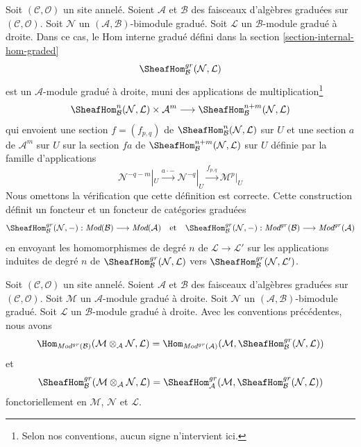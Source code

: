 \medskip\noindent
Soit $(\mathcal{C}, \mathcal{O})$ un site annelé. Soient $\mathcal{A}$ et
$\mathcal{B}$ des faisceaux d'algèbres graduées sur
$(\mathcal{C}, \mathcal{O})$. Soit $\mathcal{N}$ un
$(\mathcal{A}, \mathcal{B})$-bimodule gradué. Soit
$\mathcal{L}$ un $\mathcal{B}$-module gradué à droite. Dans ce
cas, le Hom interne gradué défini dans
la section \ref{section-internal-hom-graded}
$$
\SheafHom_\mathcal{B}^{gr}(\mathcal{N}, \mathcal{L})
$$ est un
$\mathcal{A}$-module gradué à droite, muni des
applications de multiplication\footnote{Selon nos conventions,
aucun signe n'intervient ici.}
$$
\SheafHom^n_\mathcal{B}(\mathcal{N}, \mathcal{L})
\times \mathcal{A}^m
\longrightarrow
\SheafHom^{n + m}_\mathcal{B}(\mathcal{N}, \mathcal{L})
$$ qui envoient
une section $f = (f_{p,q})$ de
$\SheafHom^n_\mathcal{B}(\mathcal{N}, \mathcal{L})$ sur $U$ et une
section $a$ de $\mathcal{A}^m$ sur $U$ sur la section
$f a$ de $\SheafHom^{n + m}_\mathcal{B}(\mathcal{N}, \mathcal{L})$ sur $U$ définie par la
famille d'applications
$$
\mathcal{N}^{-q - m}|_U \xrightarrow{a \cdot -}
\mathcal{N}^{-q}|_U \xrightarrow{f_{p, q}}
\mathcal{M}^p|_U
$$ Nous omettons
la vérification que cette définition est correcte. Cette construction
définit un foncteur et un foncteur de catégories graduées
$$
\SheafHom_\mathcal{B}^{gr}(\mathcal{N}, -)
: \textit{Mod}(\mathcal{B})
\longrightarrow
\textit{Mod}(\mathcal{A})
\quad\text{et}\quad
\SheafHom_\mathcal{B}^{gr}(\mathcal{N}, -) :
\textit{Mod}^{gr}(\mathcal{B})
\longrightarrow
\textit{Mod}^{gr}(\mathcal{A})
$$ en
envoyant les homomorphismes de degré $n$ de $\mathcal{L} \to \mathcal{L}'$ sur
les applications induites de degré $n$
de $\SheafHom_\mathcal{B}^{gr}(\mathcal{N}, \mathcal{L})$
vers $\SheafHom_\mathcal{B}^{gr}(\mathcal{N}, \mathcal{L}')$.

\begin{lemma}
\label{lemma-tensor-hom-adjunction-gr}
Soit $(\mathcal{C}, \mathcal{O})$ un site annelé. Soient $\mathcal{A}$ et
$\mathcal{B}$ des faisceaux d'algèbres graduées sur
$(\mathcal{C}, \mathcal{O})$. Soit $\mathcal{M}$ un
$\mathcal{A}$-module gradué à droite. Soit $\mathcal{N}$ un
$(\mathcal{A}, \mathcal{B})$-bimodule gradué. Soit $\mathcal{L}$ un
$\mathcal{B}$-module gradué à droite. Avec les conventions précédentes,
nous
avons $$
\Hom_{\textit{Mod}^{gr}(\mathcal{B})}(
\mathcal{M} \otimes_\mathcal{A} \mathcal{N}, \mathcal{L})
= \Hom_{\textit{Mod}^{gr}(\mathcal{A})}(
\mathcal{M}, \SheafHom_\mathcal{B}^{gr}(\mathcal{N}, \mathcal{L}))
$$
et
$$
\SheafHom_\mathcal{B}^{gr}(
\mathcal{M} \otimes_\mathcal{A} \mathcal{N}, \mathcal{L}) =
\SheafHom_\mathcal{A}^{gr}(
\mathcal{M}, \SheafHom_\mathcal{B}^{gr}(\mathcal{N}, \mathcal{L}))
$$
fonctoriellement en $\mathcal{M}$, $\mathcal{N}$ et $\mathcal{L}$.
\end{lemma}

